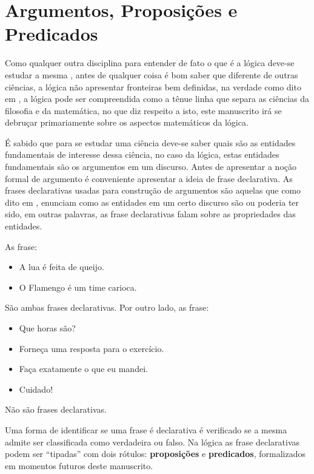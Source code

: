 \section{Argumentos, Proposições e Predicados}\label{sec:Argumento-Proposicao-Predicado}

Como qualquer outra disciplina para entender de fato o que é a lógica deve-se estudar a mesma \cite{copi1981}, antes de qualquer coisa é bom saber que diferente de outras ciências, a lógica não apresentar fronteiras bem definidas, na verdade como dito em \cite{joaoPavao2014}, a lógica pode ser compreendida como a tênue linha que separa as ciências da filosofia e da matemática, no que diz respeito a isto, este manuscrito irá se debruçar primariamente sobre os aspectos matemáticos da lógica.

É sabido que para se estudar uma ciência deve-se saber quais são as entidades fundamentais de interesse dessa ciência, no caso da lógica, estas entidades fundamentais são os argumentos em um discurso. Antes de apresentar a noção formal de argumento é conveniente apresentar a ideia de frase declarativa. As frases declarativas usadas para construção de argumentos são aquelas que como dito em \cite{joaoPavao2014}, enunciam como as entidades em um certo discurso são ou poderia ter sido, em outras palavras, as frase declarativas falam sobre as propriedades das entidades.

\begin{example}\label{exe:FrasesDeclarativas}
    As frase:
	\begin{itemize}
		\item A lua é feita de queijo.
		\item O Flamengo é um time carioca.
	\end{itemize}
	São ambas frases declarativas. Por outro lado, as frase:
	\begin{itemize}
		\item Que horas são?
		\item Forneça uma resposta para o exercício.
		\item Faça exatamente o que eu mandei.
		\item Cuidado!
	\end{itemize}
	Não são frases declarativas.
\end{example}

Uma forma de identificar se uma frase é declarativa é verificado se a mesma admite ser classificada como verdadeira ou falso.  Na lógica as frase declarativas podem ser ``tipadas'' com dois rótulos: \textbf{proposições} e \textbf{predicados}, formalizados em momentos futuros deste manuscrito. 

